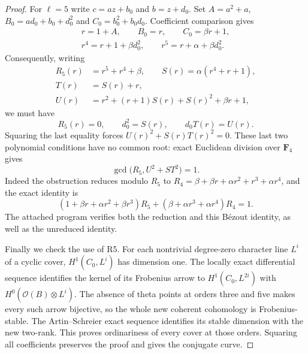 \documentclass[11pt]{article}
\begin{document}
\begin{proof}
For $\ell=5$ write $c=az+b_0$ and $b=z+d_0$.
Set $A=a^2+a$, $B_0=ad_0+b_0+d_0^2$ and
$C_0=b_0^2+b_0d_0$.  Coefficient comparison gives
\[
 \begin{gathered}
 r=1+A,\qquad B_0=r,\qquad C_0=\beta r+1,\\
 r^4=r+1+\beta d_0^2,\qquad
 r^5=r+\alpha+\beta d_0^2.
 \end{gathered}
\]
Consequently, writing
\[
 \begin{aligned}
 R_5(r)&=r^5+r^4+\beta,\qquad
 S(r)=\alpha(r^4+r+1),\\
 T(r)&=S(r)+r,\\
 U(r)&=r^2+(r+1)S(r)+S(r)^2+\beta r+1,
 \end{aligned}
\]
we must have
\[
                 R_5(r)=0,\qquad d_0^2=S(r),
                 \qquad d_0T(r)=U(r).
\]
Squaring the last equality forces
$U(r)^2+S(r)T(r)^2=0$.  These last two polynomial conditions have
no common root: exact Euclidean division over $\mathbf F_4$ gives
\[
              \gcd\bigl(R_5,U^2+ST^2\bigr)=1.             \tag{A.13}
\]
Indeed the obstruction reduces modulo $R_5$ to
$R_4=\beta+\beta r+\alpha r^2+r^3+\alpha r^4$, and the exact identity is
\[
 (1+\beta r+\alpha r^2+\beta r^3)R_5
       +(\beta+\alpha r^3+\alpha r^4)R_4=1.
\]
The attached program  verifies both the
reduction and this B\'ezout identity, as well as the unreduced identity.

Finally we check the use of R5.  For each nontrivial degree-zero character
line $L^i$ of a cyclic cover, $H^1(C_0,L^i)$ has dimension one.
The locally exact differential sequence identifies the kernel of its
Frobenius arrow to $H^1(C_0,L^{2i})$ with
$H^0(\mathcal O(B)\otimes L^i)$.  The absence of theta points at orders
three and five makes every such arrow bijective, so the whole new
coherent cohomology is Frobenius-stable.  The Artin--Schreier exact
sequence identifies its stable dimension with the new two-rank.
This proves ordinariness of every cover at those orders.  Squaring all
coefficients preserves the proof and gives the conjugate curve.
\end{proof}
\end{document}
